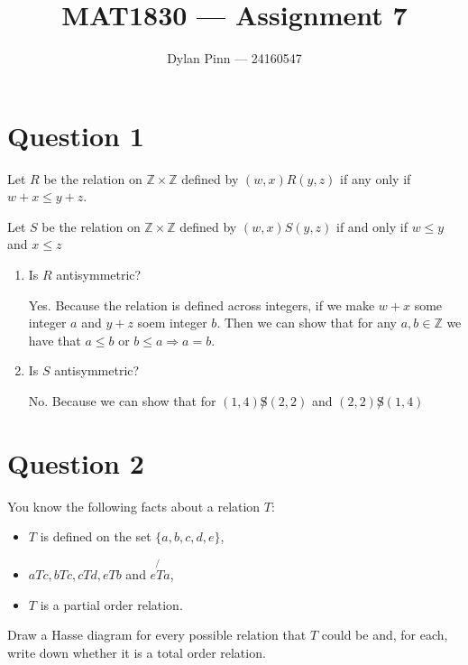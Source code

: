 \documentclass[11pt]{article}
\begin{document}
\title{MAT1830 --- Assignment 7}
\author{Dylan Pinn --- 24160547}
\maketitle

\section*{Question 1}

Let $R$ be the relation on $\mathbb{Z} \times \mathbb{Z}$ defined by $(w, x)R(y,
z)$ if any only if $w + x \leq y + z$.

\noindent
Let $S$ be the relation on $\mathbb{Z} \times \mathbb{Z}$ defined by $(w, x)S(y,
z)$ if and only if $w \leq y$ and $x \leq z$

\begin{enumerate}[label= (\alph*)]
  \item Is $R$ antisymmetric?

  Yes. Because the relation is defined across integers, if we make $w + x$ some
    integer $a$ and $y + z$ soem integer $b$. Then we can show that for any $a,b
    \in \mathbb{Z}$ we have that $a \leq b$ or $b \leq a \Rightarrow a = b$.

  \item Is $S$ antisymmetric?

    No. Because we can show that for $(1, 4)\not S(2, 2)$ and $(2,2) \not
    S(1,4)$

\end{enumerate}
\break{}

\section*{Question 2}

You know the following facts about a relation $T$:

\begin{itemize}
  \item $T$ is defined on the set $\{a, b, c, d, e \}$,
  \item $aTc, bTc, cTd, eTb$ and $e\not{T}a$,
  \item $T$ is a partial order relation.
\end{itemize}

Draw a Hasse diagram for every possible relation that $T$ could be and, for
each, write down whether it is a total order relation.
\end{document}
